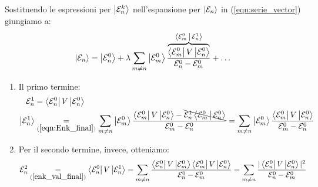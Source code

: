 \documentclass[../../FisicaTeorica.tex]{subfiles}
\begin{document}
Sostituendo le espressioni per $\Ket{\mathcal{E}_n^k}$ nell'espansione per $\Ket{\mathcal{E}_n}$ in (\ref{eqn:serie_vector}) giungiamo a:
\begin{align*}
\Ket{\mathcal{E}_n} = \Ket{\mathcal{E}_n^0} + \lambda \sum_{m\neq n} \Ket{\mathcal{E}^0_m} \frac{\overbrace{\Bra{\mathcal{E}^0_m}V \Ket{\mathcal{E}^0_n}}^{\Braket{\mathcal{E}_m^0|\mathcal{E}^1_n}}}{\mathcal{E}_n^0 - \mathcal{E}_m^0} + \dots
\end{align*}
\begin{enumerate}
\item Il primo termine:
\begin{align} \nonumber
\mathcal{E}_n^1 &= \Bra{\mathcal{E}^0_n}V \Ket{\mathcal{E}^0_n}\\
\Ket{\mathcal{E}_n^1} &\underset{(\ref{eqn:Enk_final})}{=} \sum_{m\neq n} \Ket{\mathcal{E}^0_m} \frac{\Bra{\mathcal{E}^0_m}V\Ket{\mathcal{E}^0_n}-\bcancel{\mathcal{E}_n^1 \Braket{\mathcal{E}_m^0|\mathcal{E}_n^0}}}{\mathcal{E}^0_m - \mathcal{E}^0_n} =
\sum_{m\neq n}\Ket{\mathcal{E}_m^0}\frac{\Bra{\mathcal{E}_m^0}V\Ket{\mathcal{E}_n^0}}{\mathcal{E}_m^0-\mathcal{E}_n^0}
\label{eqn:En1-vec}
\end{align}
\item Per il secondo termine, invece, otteniamo:
\begin{align*}
\mathcal{E}_n^2 &\underset{(\ref{enk_val_final})}{=} \Bra{\mathcal{E}_n^0}V \Ket{\mathcal{E}_n^1} = \sum_{m\neq n} \frac{\Bra{\mathcal{E}_n^0}V\Ket{\mathcal{E}_m^0} \Bra{\mathcal{E}_m^0}V\Ket{\mathcal{E}_n^0}}{\mathcal{E}_n^0 - \mathcal{E}_m^0} = \sum_{m\neq n} \frac{|\Bra{\mathcal{E}_n^0}V \Ket{\mathcal{E}_n^0}|^2}{\mathcal{E}_n^0 - \mathcal{E}^0_m}
\end{align*}
\end{enumerate}
\end{document}
